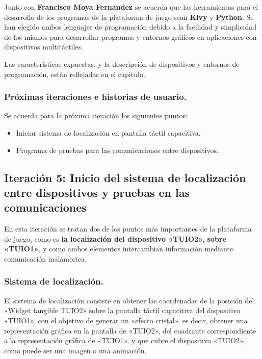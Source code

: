 Junto con \textbf{Francisco Moya Fernandez} se acuerda que las herramientas para el desarrollo de los programas de la plataforma de juego sean \textbf{Kivy} y \textbf{Python}. Se han elegido ambos lenguajes de programación debido a la facilidad y simplicidad de los mismos para desarrollar programas y entornos gráficos en aplicaciones con dispositivos multitáctiles.


Las características expuestas, y la descripción de dispositivos y entornos de programación, están reflejadas en el capitulo.

\subsubsection{Próximas iteraciones e historias de usuario.}
Se acuerda para la próxima iteración los siguientes puntos:
\begin{itemize}
\item Iniciar sistema de localización en pantalla táctil capacitiva.
\item Programa de pruebas para las comunicaciones entre dispositivos. 
\end{itemize}


\subsection{Iteración 5: Inicio del sistema de localización entre dispositivos y pruebas en las comunicaciones }

En esta iteración se tratan dos de los puntos más importantes de la plataforma de juego, como es \textbf{la localización del dispositivo «TUIO2», sobre «TUIO1»}, y como ambos elementos intercambian información mediante comunicación inalámbrica.

\subsubsection{Sistema de localización.}

El sistema de localización consiste en obtener las coordenadas de la posición del «Widget tangible TUIO2» sobre la pantalla táctil capacitiva del dispositivo «TUIO1», con el objetivo de generar un «efecto cristal», es decir, obtener una representación gráfica en la pantalla de «TUIO2», del cuadrante correspondiente a la representación gráfica de «TUIO1», y que cubre el dispositivo «TUIO2», como puede ser una imagen o una animación.\

